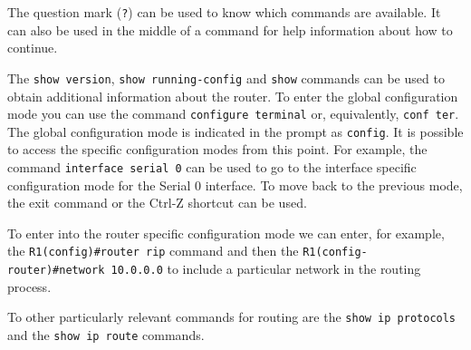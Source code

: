 The question mark (\texttt{?}) can be used to know which commands are available.
It can also be used in the middle of a command for help information about how to continue.

The \texttt{show version}, \texttt{show running-config} and \texttt{show} commands can be used to obtain additional information about the router.
To enter the global configuration mode you can use the command \texttt{configure terminal} or, equivalently, \texttt{conf ter}.
The global configuration mode is indicated in the prompt as \texttt{config}.
It is possible to access the specific configuration modes from this point.
For example, the command \texttt{interface serial 0} can be used to go to the interface specific configuration mode for the Serial 0 interface.
To move back to the previous mode, the exit command or the Ctrl-Z shortcut can be used.

To enter into the router specific configuration mode we can enter, for example, the \texttt{R1(config)\#router rip} command and then the \texttt{R1(config-router)\#network 10.0.0.0} to include a particular network in the routing process.

To other particularly relevant commands for routing are the \texttt{show ip protocols} and the \texttt{show ip route} commands.
